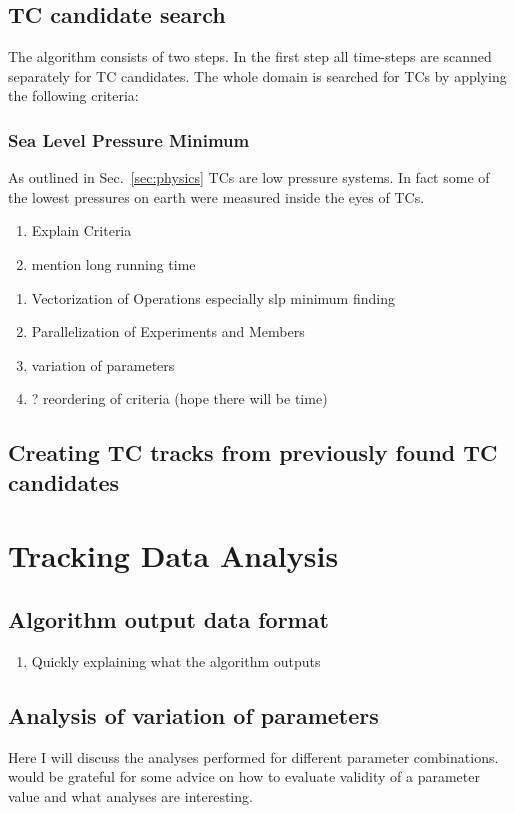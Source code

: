 \subsection{TC candidate search}

The algorithm consists of two steps. In the first step all time-steps are scanned separately for TC candidates. The whole domain is searched for TCs by applying the following criteria:
\subsubsection*{Sea Level Pressure Minimum}
As outlined in Sec.~\ref{sec:physics} TCs are low pressure systems. In fact some of the lowest pressures on earth were measured inside the eyes of TCs. 

\begin{enumerate}
    \item Explain Criteria
    \item mention long running time
\end{enumerate}
\begin{enumerate}
    \item Vectorization of Operations especially slp minimum finding
    \item Parallelization of Experiments and Members
    \item variation of parameters
    \item ? reordering of criteria (hope there will be time)
\end{enumerate}
\subsection{Creating TC tracks from previously found TC candidates}

\section{Tracking Data Analysis}
\subsection{Algorithm output data format}
\begin{enumerate}
    \item Quickly explaining what the algorithm outputs
\end{enumerate}
\subsection{Analysis of variation of parameters}
Here I will discuss the analyses performed for different parameter combinations.
would be grateful for some advice on how to evaluate validity of a parameter value and what analyses are interesting.
